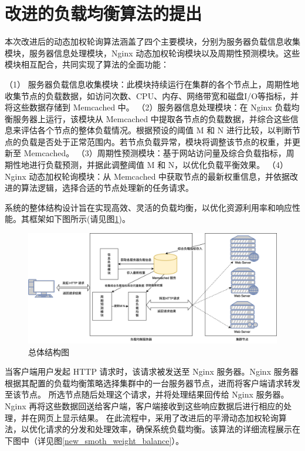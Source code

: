 \section{改进的负载均衡算法的提出}
本次改进后的动态加权轮询算法涵盖了四个主要模块，分别为服务器负载信息收集模块，服务器信息处理模块，Nginx 动态加权轮询模块以及周期性预测模块。这些模块相互配合，共同实现了算法的全面功能：

（1） 服务器负载信息收集模块：此模块持续运行在集群的各个节点上，周期性地收集节点的负载数据，如访问次数、CPU、内存、网络带宽和磁盘I/O等指标，并将这些数据存储到 Memcached 中。
（2）服务器信息处理模块：在 Nginx 负载均衡服务器上运行，该模块从 Memcached 中提取各节点的负载数据，并综合这些信息来评估各个节点的整体负载情况。根据预设的阈值 M 和 N 进行比较，以判断节点的负载是否处于正常范围内。若节点负载异常，模块将调整该节点的权重，并更新至 Memcached。
（3）周期性预测模块：基于网站访问量及综合负载指标，周期性地进行负载预测，并据此调整阈值 M 和 N，以优化负载平衡效果。
（4）Nginx 动态加权轮询模块：从 Memcached 中获取节点的最新权重信息，并依据改进的算法逻辑，选择合适的节点处理新的任务请求。

系统的整体结构设计旨在实现高效、灵活的负载均衡，以优化资源利用率和响应性能。其框架如下图所示(请见图\ref{total_structure_flow})。

\begin{figure}[htbp]
  \centering
  \includegraphics[width=\textwidth]{figures/landbalance_module.png}
  \caption{总体结构图}
  \label{total_structure_flow}
\end{figure}

当客户端用户发起 HTTP 请求时，该请求被发送至 Nginx 服务器。Nginx 服务器根据其配置的负载均衡策略选择集群中的一台服务器节点，进而将客户端请求转发至该节点。
所选节点随后处理这个请求，并将处理结果回传给 Nginx 服务器。Nginx 再将这些数据回送给客户端，客户端接收到这些响应数据后进行相应的处理，并在网页上显示结果。
在此流程中，采用了改进后的平滑动态加权轮询算法，以优化请求的分发和处理效率，确保系统负载均衡。该算法的详细流程展示在下图中（详见图\ref{new_smoth_weight_balance}）。

